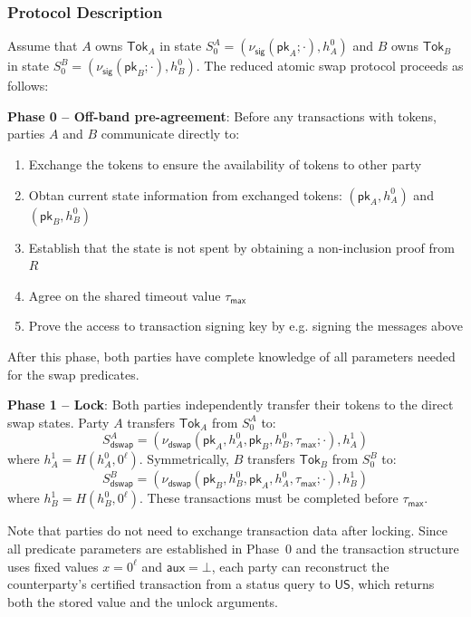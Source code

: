 \documentclass{article}
\newcommand{\pubkey}[0]{\mathsf{pk}}
\newcommand{\unisrv}[0]{\mathsf{US}}
\newcommand{\auxd}[0]{\mathsf{aux}}
\begin{document}
\subsubsection{Protocol Description}

Assume that $A$ owns $\mathsf{Tok}_A$ in state $S^A_0 = (\nu_\mathsf{sig}(\pubkey_A;\cdot), h^0_A)$ and $B$ owns $\mathsf{Tok}_B$ in state $S^B_0 = (\nu_\mathsf{sig}(\pubkey_B;\cdot), h^0_B)$. The reduced atomic swap protocol proceeds as follows:\medskip

\noindent\textbf{Phase 0 -- Off-band pre-agreement}: Before any transactions with tokens, parties $A$ and $B$ communicate directly to:
\begin{enumerate}
\item Exchange the tokens to ensure the availability of tokens to other party
\item Obtan current state information from exchanged tokens: $(\pubkey_A, h^0_A)$ and $(\pubkey_B, h^0_B)$
\item Establish that the state is not spent by obtaining a non-inclusion proof from $R$
\item Agree on the shared timeout value $\tau_\mathsf{max}$
\item Prove the access to transaction signing key by e.g. signing the messages above
\end{enumerate}
After this phase, both parties have complete knowledge of all parameters needed for the swap predicates.\medskip

\noindent\textbf{Phase 1 -- Lock}: Both parties independently transfer their tokens to the direct swap states. Party $A$ transfers $\mathsf{Tok}_A$ from $S^A_0$ to:
\[
S^A_\mathsf{dswap} = (\nu_\mathsf{dswap}(\pubkey_A, h^0_A, \pubkey_B, h^0_B, \tau_\mathsf{max};\cdot), h^1_A)
\]
where $h^1_A = H(h^0_A, 0^\ell)$. Symmetrically, $B$ transfers $\mathsf{Tok}_B$ from $S^B_0$ to:
\[
S^B_\mathsf{dswap} = (\nu_\mathsf{dswap}(\pubkey_B, h^0_B, \pubkey_A, h^0_A, \tau_\mathsf{max};\cdot), h^1_B)
\]
where $h^1_B = H(h^0_B, 0^\ell)$. These transactions must be completed before $\tau_\mathsf{max}$.

Note that parties do not need to exchange transaction data after locking. Since all predicate parameters are established in Phase~0 and the transaction structure uses fixed values $x = 0^\ell$ and $\auxd = \bot$, each party can reconstruct the counterparty's certified transaction from a status query to $\unisrv$, which returns both the stored value and the unlock arguments.\medskip
\end{document}
